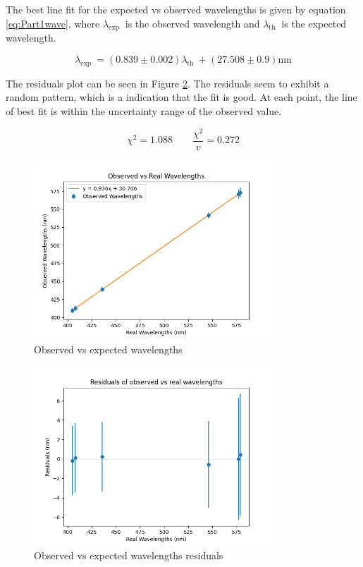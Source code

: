 The best line fit for the expected vs observed wavelengths is given by equation \ref{eq:Part1wave}, where $\lambda_{\text {exp }}$ is the observed wavelength and $\lambda_{\text {th }}$ is the expected wavelength.

\begin{equation}
    \lambda_{\text {exp }} = (0.839 \pm 0.002) \lambda_{\text {th }} + (27.508 \pm 0.9) \text{nm}
    \label{eq:Part1wave}
\end{equation}

The residuals plot can be seen in Figure \ref{fig:Part1waveU}. The residuals seem to exhibit a random pattern, which is a indication that the fit is good. At each point, the line of best fit is within
the uncertainty range of the observed value.

\begin{equation}
    \chi^2 = 1.088 \qquad
    \frac{\chi^2}{v} = 0.272
\end{equation}

\begin{figure}[H]
    \centering
    \includegraphics[width=0.8\textwidth]{Results/Sections/Part1/Part1_wavelength_observed_vs_expected.png}
    \caption{Observed vs expected wavelengths}
    \label{fig:Part1wave}
\end{figure}


\begin{figure}[H]
    \centering
    \includegraphics[width=0.8\textwidth]{Results/Sections/Part1/Part1_wavelength_observed_vs_expected_residuals.png}
    \caption{Observed vs expected wavelengths residuals}
    \label{fig:Part1waveU}
\end{figure}



